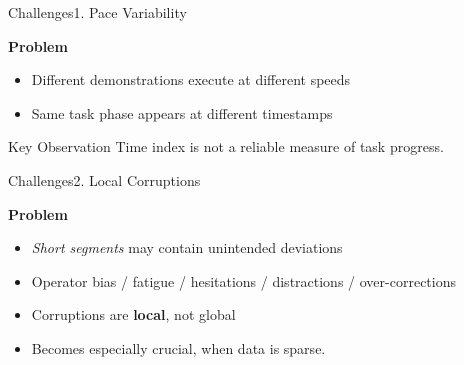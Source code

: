 \documentclass{beamer}
\begin{document}
\begin{frame}{Challenges}{1. Pace Variability}

    \textbf{Problem}
    \begin{itemize}
        \item Different demonstrations execute at different speeds
        \item Same task phase appears at different timestamps
    \end{itemize}

    \vspace{1em}

    \centering


    \vspace{1em}

    \begin{alertblock}{Key Observation}
        Time index is not a reliable measure of task progress.
    \end{alertblock}

\end{frame}

\begin{frame}{Challenges}{2. Local Corruptions}

    \textbf{Problem}
    \begin{itemize}
        \item \textit{Short segments} may contain unintended deviations
        \item Operator bias / fatigue / hesitations / distractions / over-corrections
        \item Corruptions are \textbf{local}, not global
    \end{itemize}

    \vspace{1em}

    \begin{itemize}
        \item Becomes especially crucial, when data is sparse.
    \end{itemize}

\end{frame}
\end{document}
